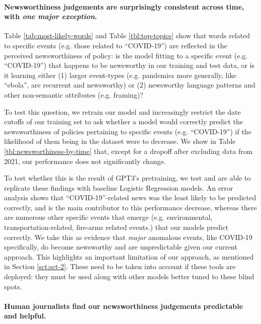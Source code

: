 \documentclass[11pt]{article}
\begin{document}
\paragraph{Newsworthiness judgements are surprisingly consistent across time, with \textit{one major exception}.}
Table \ref{tab:most-likely-words} and Table \ref{tbl:top-topics} show that words related to specific events (e.g. those related to ``COVID-19'') are reflected in the perceived newsworthiness of policy: is the model fitting to a specific event (e.g. ``COVID-19'') that happens to be newsworthy in our training and test data, or is it learning  either (1) larger event-types (e.g. pandemics more generally,  like ``ebola'', are recurrent and newsworthy) or (2) newsworthy language patterns and other non-semantic attributes (e.g. framing)? 

To test this question, we retrain our model and increasingly restrict the date cutoffs of our training set to ask whether a model would correctly predict the newsworthiness of policies pertaining to specific events (e.g. ``COVID-19'') if the likelihood of them being in the dataset were to decrease. We show in Table \ref{tbl:newsworthiness-by-time} that, except for a dropoff after excluding data from 2021, our performance does not significantly change. 

To test whether this is the result of GPT3's pretraining, we test and are able to replicate these findings with baseline Logistic Regression models. An error analysis shows that ``COVID-19''-related news was the least likely to be predicted correctly, and is the main contributor to this performance decrease, whereas there are numerous other specific events that emerge (e.g. environmental, transportation-related, fire-arms related events.) that our models predict correctly. We take this as evidence that \textit{major} anomalous events, like COVID-19 specifically, do become newsworthy and are unpredictable given our current approach. This highlights an important limitation of our approach, as mentioned in Section \ref{sct:sct-2}. These need to be taken into account if these tools are deployed: they must be used along with other models better tuned to these blind spots. 

\paragraph{Human journalists find our newsworthiness judgements predictable and helpful.}
\end{document}
